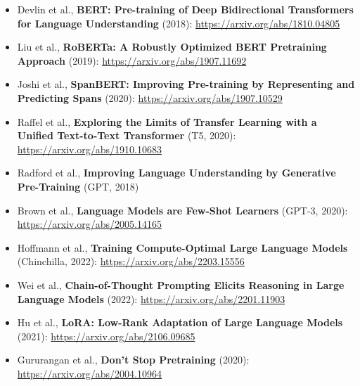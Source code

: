\documentclass[a4paper]{article}
\begin{document}
\begin{itemize}
    \item Devlin et al., \textbf{BERT: Pre-training of Deep Bidirectional Transformers for Language Understanding} (2018): \url{https://arxiv.org/abs/1810.04805}
    \item Liu et al., \textbf{RoBERTa: A Robustly Optimized BERT Pretraining Approach} (2019): \url{https://arxiv.org/abs/1907.11692}
    \item Joshi et al., \textbf{SpanBERT: Improving Pre-training by Representing and Predicting Spans} (2020): \url{https://arxiv.org/abs/1907.10529}
    \item Raffel et al., \textbf{Exploring the Limits of Transfer Learning with a Unified Text-to-Text Transformer} (T5, 2020): \url{https://arxiv.org/abs/1910.10683}
    \item Radford et al., \textbf{Improving Language Understanding by Generative Pre-Training} (GPT, 2018)
    \item Brown et al., \textbf{Language Models are Few-Shot Learners} (GPT-3, 2020): \url{https://arxiv.org/abs/2005.14165}
    \item Hoffmann et al., \textbf{Training Compute-Optimal Large Language Models} (Chinchilla, 2022): \url{https://arxiv.org/abs/2203.15556}
    \item Wei et al., \textbf{Chain-of-Thought Prompting Elicits Reasoning in Large Language Models} (2022): \url{https://arxiv.org/abs/2201.11903}
    \item Hu et al., \textbf{LoRA: Low-Rank Adaptation of Large Language Models} (2021): \url{https://arxiv.org/abs/2106.09685}
    \item Gururangan et al., \textbf{Don't Stop Pretraining} (2020): \url{https://arxiv.org/abs/2004.10964}
\end{itemize}
\end{document}
